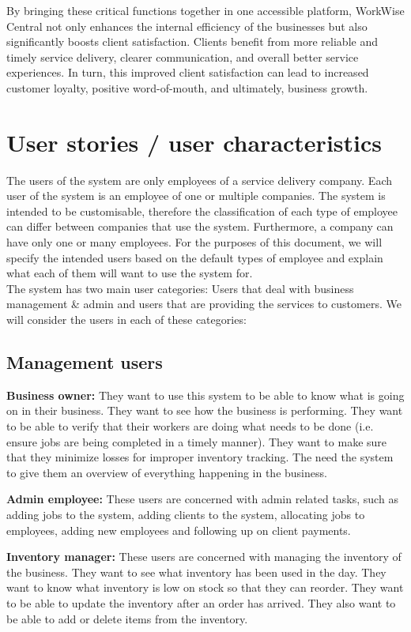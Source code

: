 \documentclass{article}
\begin{document}
	By bringing these critical functions together in one accessible platform, WorkWise Central not only enhances the internal efficiency of the businesses but also significantly boosts client satisfaction. Clients benefit from more reliable and timely service delivery, clearer communication, and overall better service experiences. In turn, this improved client satisfaction can lead to increased customer loyalty, positive word-of-mouth, and ultimately, business growth.\\
	
	\newpage
	
	\section*{User stories / user characteristics}
	The users of the system are only employees of a service delivery company. Each user of the system is an employee of one or multiple companies.
	The system is intended to be customisable, therefore the classification of each type of employee can differ between companies that use the system. Furthermore, a company can have only one or many employees. For the purposes of this document, we will specify the intended users based on the default types of employee and explain what each of them will want to use the system for. \\
	
	The system has two main user categories: Users that deal with business management \& admin and users that are providing the services to customers. We will consider the users in each of these categories:
	
	\subsection*{Management users}
	\begin{list}{.}{}
		\item \textbf{Business owner:} They want to use this system to be able to know what is going on in their business. They want to see how the business is performing. They want to be able to verify that their workers are doing what needs to be done (i.e. ensure jobs are being completed in a timely manner). They want to make sure that they minimize losses for improper inventory tracking. The need the system to give them an overview of everything happening in the business.
		\item \textbf{Admin employee:} These users are concerned with admin related tasks, such as adding jobs to the system, adding clients to the system, allocating jobs to employees, adding new employees and following up on client payments.
		\item \textbf{Inventory manager:} These users are concerned with managing the inventory of the business. They want to see what inventory has been used in the day. They want to know what inventory is low on stock so that they can reorder. They want to be able to update the inventory after an order has arrived. They also want to be able to add or delete items from the inventory. 
	\end{list}
	
\end{document}
